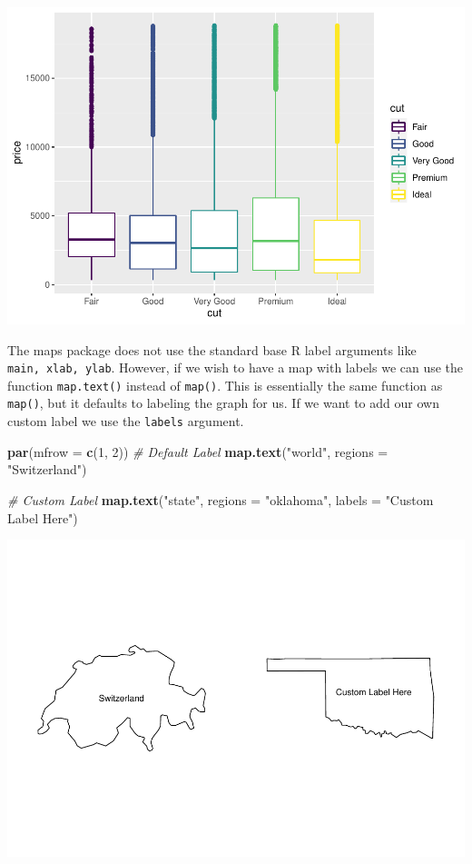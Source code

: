 \documentclass[
]{book}
\newenvironment{Shaded}{\begin{snugshade}}{\end{snugshade}}
\newcommand{\CommentTok}[1]{\textcolor[rgb]{0.56,0.35,0.01}{\textit{#1}}}
\newcommand{\DataTypeTok}[1]{\textcolor[rgb]{0.13,0.29,0.53}{#1}}
\newcommand{\DecValTok}[1]{\textcolor[rgb]{0.00,0.00,0.81}{#1}}
\newcommand{\KeywordTok}[1]{\textcolor[rgb]{0.13,0.29,0.53}{\textbf{#1}}}
\newcommand{\NormalTok}[1]{#1}
\newcommand{\StringTok}[1]{\textcolor[rgb]{0.31,0.60,0.02}{#1}}
\begin{document}
\includegraphics{_main_files/figure-latex/unnamed-chunk-258-1.pdf}

The maps package does not use the standard base R label arguments like \texttt{main,\ xlab,\ ylab}. However, if we wish to have a map with labels we can use the function \texttt{map.text()} instead of \texttt{map()}. This is essentially the same function as \texttt{map()}, but it defaults to labeling the graph for us. If we want to add our own custom label we use the \texttt{labels} argument.

\begin{Shaded}
\begin{Highlighting}[]
\KeywordTok{par}\NormalTok{(}\DataTypeTok{mfrow =} \KeywordTok{c}\NormalTok{(}\DecValTok{1}\NormalTok{, }\DecValTok{2}\NormalTok{))}
\CommentTok{# Default Label}
\KeywordTok{map.text}\NormalTok{(}\StringTok{"world"}\NormalTok{, }\DataTypeTok{regions =} \StringTok{"Switzerland"}\NormalTok{)}

\CommentTok{# Custom Label}
\KeywordTok{map.text}\NormalTok{(}\StringTok{"state"}\NormalTok{, }\DataTypeTok{regions =} \StringTok{"oklahoma"}\NormalTok{, }\DataTypeTok{labels =} \StringTok{"Custom Label Here"}\NormalTok{)}
\end{Highlighting}
\end{Shaded}

\includegraphics{_main_files/figure-latex/unnamed-chunk-259-1.pdf}
\end{document}

